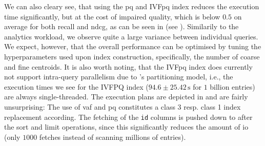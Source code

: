 We can also cleary see, that using the \acrshort{pq} and IVF\acrshort{pq} index reduces the execution time significantly, but at the cost of impaired quality, which is below $0.5$ on average for both recall and \acrshort{ndcg}, as can be seen in  (see ). Similarily to the analytics workload, we observe quite a large variance between individual queries. We expect, however, that the overall performance can be optimised by tuning the hyperparameters used upon index construction, specifically, the number of coarse and fine centroids. It is also worth noting, that the IVF\acrshort{pq} index does currently not support intra-query parallelism due to \cottontail{}'s partitioning model, i.e., the execution times we see for the IVFPQ index ($94.6 \pm 25.42 \, \si{\second}$ for $1$ billion entries) are always single-threaded. The execution plans are depicted in  and are fairly unsurprising: The use of \acrshort{vaf} and \acrshort{pq} constitutes a class 3 resp. class 1 index replacement according. The fetching of the \texttt{id} columns is pushed down to after the sort and limit operations, since this significantly reduces the amount of \acrshort{io} (only $1000$ fetches instead of scanning millions of entries).

